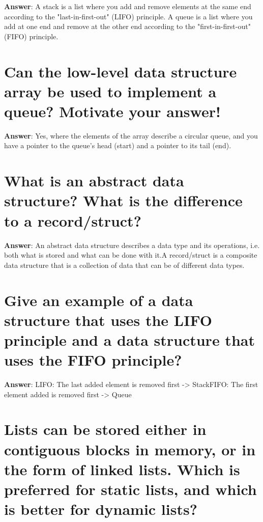 \documentclass[a4paper,11pt,oneside]{book}
\begin{document}
\begin{sloppypar}
\label{q:258:sa:en:True}

\textbf{Answer}: A stack is a list where you add and remove elements at the same end according to the "last-in-first-out" (LIFO) principle. A queue is a list where you add at one end and remove at the other end according to the "first-in-first-out" (FIFO) principle.



\section{Can the low-level data structure array be used to implement a queue? Motivate your answer!}

\label{q:259:sa:en:True}

\textbf{Answer}: Yes, where the elements of the array describe a circular queue, and you have a pointer to the queue's head (start) and a pointer to its tail (end).



\section{What is an abstract data structure? What is the difference to a record/struct?}

\label{q:260:sa:en:True}

\textbf{Answer}: An abstract data structure describes a data type and its operations, i.e. both what is stored and what can be done with it.A record/struct is a composite data structure that is a collection of data that can be of different data types.



\section{Give an example of a data structure that uses the LIFO principle and a data structure that uses the FIFO principle?}

\label{q:261:sa:en:True}

\textbf{Answer}: LIFO: The last added element is removed first -> StackFIFO: The first element added is removed first -> Queue



\section{Lists can be stored either in contiguous blocks in memory, or in the form of linked lists. Which is preferred for static lists, and which is better for dynamic lists?}


\end{sloppypar}
\end{document}
